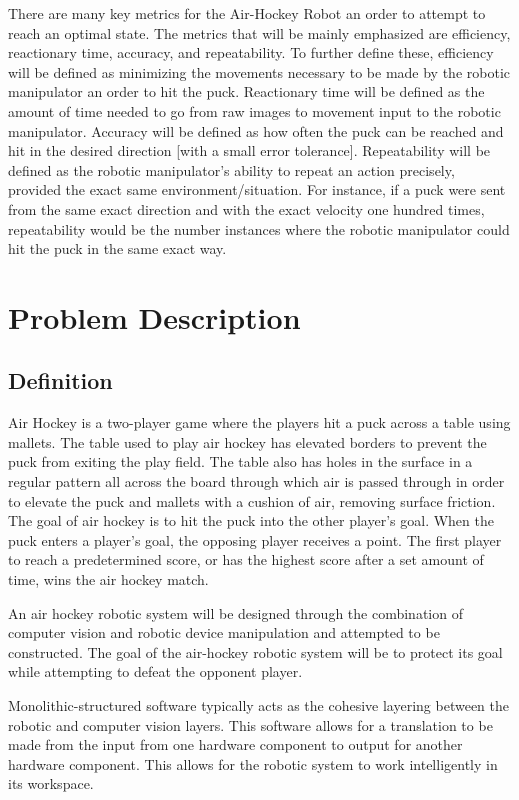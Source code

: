 \documentclass[letterpaper, 12 pt, conference]{ieeeconf}
\begin{document}
There are many key metrics for the Air-Hockey Robot an order to attempt to reach an optimal state. The metrics that will be mainly emphasized are efficiency, reactionary time, accuracy, and repeatability. To further define these, efficiency will be defined as minimizing the movements necessary to be made by the robotic manipulator an order to hit the puck.  Reactionary time will be defined as the amount of time needed to go from raw images to movement input to the robotic manipulator. Accuracy will be defined as how often the puck can be reached and hit in the desired direction [with a small error tolerance].  Repeatability will be defined as the robotic manipulator’s ability to repeat an action precisely, provided the exact same environment/situation. For instance, if a puck were sent from the same exact direction and with the exact velocity one hundred times, repeatability would be the number instances where the robotic manipulator could hit the puck in the same exact way.

\section{Problem Description}
\label{problemdescription}
\subsection{Definition}
\label{definition}
Air Hockey is a two-player game where the players hit a puck across a table using mallets. The table used to play air hockey has elevated borders to prevent the puck from exiting the play field.  The table also has holes in the surface in a regular pattern all across the board through which air is passed through in order to elevate the puck and mallets with a cushion of air, removing surface friction. The goal of air hockey is to hit the puck into the other player’s goal. When the puck enters a player’s goal, the opposing player receives a point.  The first player to reach a predetermined score, or has the highest score after a set amount of time, wins the air hockey match.

An air hockey robotic system will be designed through the combination of computer vision and robotic device manipulation and attempted to be constructed.  The goal of the air-hockey robotic system will be to protect its goal while attempting to defeat the opponent player.

Monolithic-structured software typically acts as the cohesive layering between the robotic and computer vision layers.  This software allows for a translation to be made from the input from one hardware component to output for another hardware component.  This allows for the robotic system to work intelligently in its workspace. 
\end{document}
